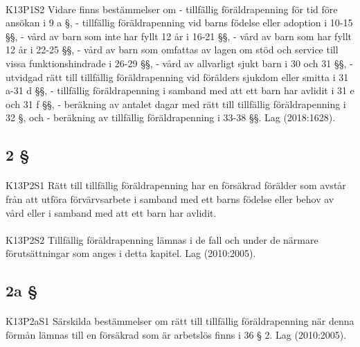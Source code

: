\documentclass[a4paper,notitlepage,openany,10pt]{book}
\begin{document}
\paragraph*{}
{\tiny K13P1S2}
Vidare finns bestämmelser om
\newline - tillfällig föräldrapenning för tid före ansökan i 9 a §,
\newline - tillfällig föräldrapenning vid barns födelse eller adoption i 10-15 §§,
\newline - vård av barn som inte har fyllt 12 år i 16-21 §§,
\newline - vård av barn som har fyllt 12 år i 22-25 §§,
\newline - vård av barn som omfattas av lagen om stöd och service till vissa funktionshindrade i 26-29 §§,
\newline - vård av allvarligt sjukt barn i 30 och 31 §§,
\newline - utvidgad rätt till tillfällig föräldrapenning vid förälders sjukdom eller smitta i 31 a-31 d §§,
\newline - tillfällig föräldrapenning i samband med att ett barn har avlidit i 31 e och 31 f §§,
\newline - beräkning av antalet dagar med rätt till tillfällig föräldrapenning i 32 §, och
\newline - beräkning av tillfällig föräldrapenning i 33-38 §§.
Lag (2018:1628).
\subsection*{2 §}
\paragraph*{}
{\tiny K13P2S1}
Rätt till tillfällig föräldrapenning har en försäkrad förälder som avstår från att utföra förvärvsarbete i samband med ett barns födelse eller behov av vård eller i samband med att ett barn har avlidit.
\paragraph*{}
{\tiny K13P2S2}
Tillfällig föräldrapenning lämnas i de fall och under de närmare förutsättningar som anges i detta kapitel.
Lag (2010:2005).
\subsection*{2a §}
\paragraph*{}
{\tiny K13P2aS1}
Särskilda bestämmelser om rätt till tillfällig föräldrapenning när denna förmån lämnas till en försäkrad som är arbetslös finns i 36 § 2.
Lag (2010:2005).
\end{document}
